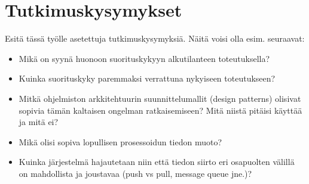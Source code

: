 \section{Tutkimuskysymykset}
Esitä tässä työlle asetettuja tutkimuskysymyksiä. Näitä voisi olla esim. seuraavat:
\begin{itemize}
	\item Mikä on syynä huonoon suorituskykyyn alkutilanteen toteutuksella?
	\item Kuinka suorituskyky paremmaksi verrattuna nykyiseen toteutukseen?
	\item Mitkä ohjelmiston arkkitehtuurin suunnittelumallit (design patterns) olisivat sopivia tämän kaltaisen ongelman ratkaisemiseen? Mitä niistä pitäisi käyttää ja mitä ei?
	\item Mikä olisi sopiva lopullisen prosessoidun tiedon muoto?
	\item Kuinka järjestelmä hajautetaan niin että tiedon siirto eri osapuolten välillä on mahdollista ja joustavaa (push vs pull, message queue jne.)?
\end{itemize}